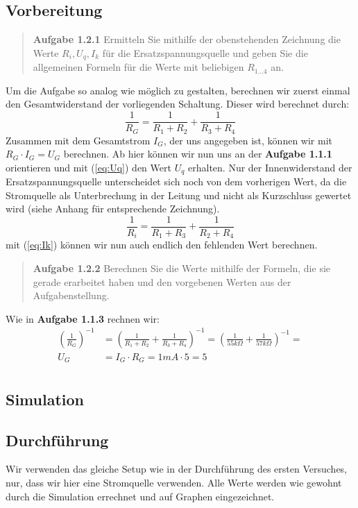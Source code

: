 \documentclass{scrarticle}
\begin{document}
\subsection{Vorbereitung}
\begin{abstract}
  \textbf{Aufgabe 1.2.1} Ermitteln Sie mithilfe der obenstehenden Zeichnung die Werte $R_i, U_q, I_k$ für die Ersatzspannungsquelle
  und geben Sie die allgemeinen Formeln für die Werte mit beliebigen $R_{1...4}$ an.
\end{abstract}
Um die Aufgabe so analog wie möglich zu gestalten, berechnen wir zuerst einmal den Gesamtwiderstand der vorliegenden Schaltung. Dieser wird berechnet durch:
\begin{equation}\label{eq:RG}
  \frac{1}{R_G} = \frac{1}{R_1 + R_2} + \frac{1}{R_3 + R_4}
\end{equation}
Zusammen mit dem Gesamtstrom $I_G$, der uns angegeben ist, können wir mit $R_G \cdot I_G = U_G$ berechnen. Ab hier können wir nun uns an der
\textbf{Aufgabe 1.1.1} orientieren und mit (\ref{eq:Uq}) den Wert $U_q$ erhalten. Nur der Innenwiderstand der Ersatzspannungsquelle unterscheidet sich noch
von dem vorherigen Wert, da die Stromquelle als Unterbrechung in der Leitung und nicht als Kurzschluss gewertet wird (siehe Anhang für entsprechende Zeichnung).
\begin{equation*}
  \frac{1}{R_i} = \frac{1}{R_1 + R_3} + \frac{1}{R_2 + R_4}
\end{equation*}
mit (\ref{eq:Ik}) können wir nun auch endlich den fehlenden Wert berechnen.
\begin{abstract}
  \textbf{Aufgabe 1.2.2} Berechnen Sie die Werte mithilfe der Formeln, die sie gerade erarbeitet haben und den vorgebenen Werten aus der Aufgabenstellung.
\end{abstract}
Wie in \textbf{Aufgabe 1.1.3} rechnen wir:
\begin{equation*}
  \begin{aligned}
    \left(\frac{1}{R_G}\right)^{-1} &= \left(\frac{1}{R_1 + R_2} + \frac{1}{R_3 + R_4}\right)^{-1} = \left(\frac{1}{55k\Omega} + \frac{1}{57k\Omega}\right)^{-1} = \\
    U_G &= I_G \cdot R_G = 1mA \cdot 5 = 5\\
  \end{aligned}
\end{equation*}
\subsection{Simulation}
\subsection{Durchführung}
Wir verwenden das gleiche Setup wie in der Durchführung des ersten Versuches, nur, dass wir hier eine Stromquelle verwenden.
Alle Werte werden wie gewohnt durch die Simulation errechnet und auf Graphen eingezeichnet.
\end{document}
